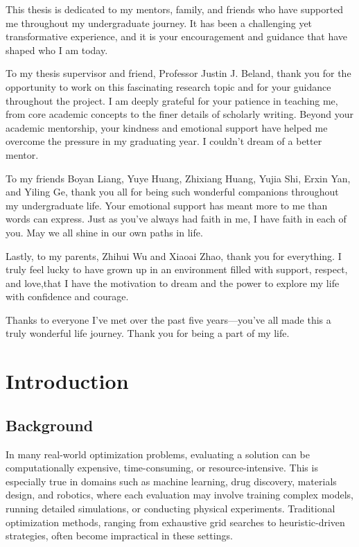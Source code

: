 \documentclass{ut-thesis}
\begin{document}
\begin{acknowledgements}
This thesis is dedicated to my mentors, family, and friends who have supported me throughout my undergraduate journey. It has been a challenging yet transformative experience, and it is your encouragement and guidance that have shaped who I am today.

To my thesis supervisor and friend, Professor Justin J. Beland, thank you for the opportunity to work on this fascinating research topic and for your guidance throughout the project. I am deeply grateful for your patience in teaching me, from core academic concepts to the finer details of scholarly writing. Beyond your academic mentorship, your kindness and emotional support have helped me overcome the pressure in my graduating year. I couldn't dream of a better mentor.

To my friends Boyan Liang, Yuye Huang, Zhixiang Huang, Yujia Shi, Erxin Yan, and Yiling Ge, thank you all for being such wonderful companions throughout my undergraduate life. Your emotional support has meant more to me than words can express. Just as you’ve always had faith in me, I have faith in each of you. May we all shine in our own paths in life.

Lastly, to my parents, Zhihui Wu and Xiaoai Zhao, thank you for everything. I truly feel lucky to have grown up in an environment filled with support, respect, and love,that I have the motivation to dream and the power to explore my life with confidence and courage. 

Thanks to everyone I’ve met over the past five years—you’ve all made this a truly wonderful life journey. Thank you for being a part of my life.

\end{acknowledgements}

{\footnotesize\setlength{\parskip}{10pt}\tableofcontents}

{\footnotesize\setlength{\parskip}{10pt}\listoffigures}

\clearpage


\chapter{Introduction}

\section{Background}

In many real-world optimization problems, evaluating a solution can be computationally expensive, time-consuming, or resource-intensive. This is especially true in domains such as machine learning, drug discovery, materials design, and robotics, where each evaluation may involve training complex models, running detailed simulations, or conducting physical experiments\cite{berkenkamp2023bayesian}\cite{zhang2020bayesian}\cite{8539993}. Traditional optimization methods, ranging from exhaustive grid searches to heuristic-driven strategies, often become impractical in these settings.
\end{document}
